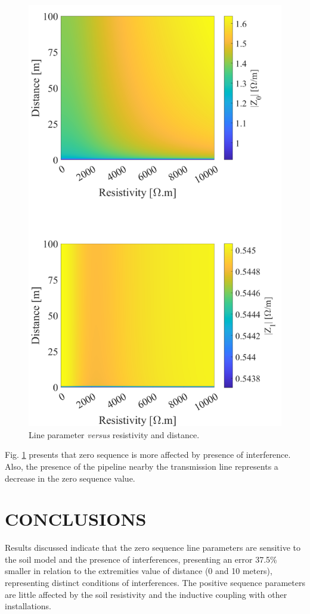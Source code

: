 \documentclass[conference]{IEEEtran}
\begin{document}
\begin{figure}[hbt]
	\begin{center}
		\includegraphics[width=.8\columnwidth]{fig/Impedance.pdf}
		\caption{Line parameter \textit{versus} resistivity and distance.}
		\label{fig:Impedance}
	\end{center}
\end{figure}

Fig. \ref{fig:Impedance} presents that zero sequence is more affected by presence of interference. Also, the presence of the pipeline nearby the transmission line represents a decrease in the zero sequence value.

\section{CONCLUSIONS}

Results discussed indicate that the zero sequence line parameters are sensitive to the soil model and the presence of interferences, presenting an error 37.5\% smaller in relation to the extremities value of distance (0 and 10 meters), representing distinct conditions of interferences. The positive sequence parameters are little affected by the soil resistivity and the inductive coupling with other installations.
\end{document}
